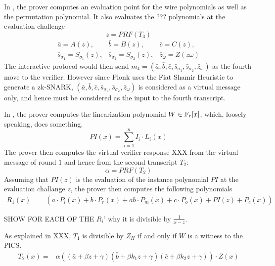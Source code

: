In , the prover computes an evaluation point for the wire polynomials as well as the permutation polynomial. It also evaluates the ??? polynomials at the evaluation challenge  
\begin{equation}
z=PRF(T_3)
\end{equation}
\begin{equation}
\begin{array}{lll}
\bar{a}=A(z), & \bar{b}=B(z), & \bar{c}=C(z), \\ 
\bar{s}_{\sigma_1}=S_{\sigma_1}(z), & \bar{s}_{\sigma_2}=S_{\sigma_2}(z), &\bar{z}_{\omega}=Z(z{\omega})
\end{array}
\end{equation}
The interactive protocol would then send $m_4=(\bar{a}, \bar{b}, \bar{c}, \bar{s}_{\sigma_1},
\bar{s}_{\sigma_2}, \bar{z}_{\omega})$ as the fourth move to the verifier. However since Plonk uses the Fiat Shamir Heuristic to generate a zk-SNARK, $(\bar{a}, \bar{b}, \bar{c}, \bar{s}_{\sigma_1},\bar{s}_{\sigma_2}, \bar{z}_{\omega})$ is considered as a virtual message only, and hence must be considered as the input to the fourth transcript.

In , the prover computes the linearization polynomial  $W\in \mathbb{F}_r[x]$, which, loosely speaking, does something.
\begin{equation}
PI(x) = \textstyle \sum_{i=1}^n I_i\cdot L_i(x)
\end{equation}
The prover then computes the virtual verifier response XXX from the virtual message of round $1$ and hence from the second transcript $T_2$: 
\begin{equation}
\alpha=PRF(T_2)
\end{equation}
Assuming that $PI(z)$ is the evaluation of the instance polynomial $PI$ at the evaluation challange $z$, the prover then computes the following polynomials
\begin{equation}
\begin{array}{rl}
R_1(x) = & \left(\bar{a} \cdot P_l(x) + \bar{b} \cdot P_r(x) + \bar{a}\bar{b} \cdot P_m(x) + \bar{c} \cdot P_o(x) + PI(z) + P_c(x)\right)
\end{array}
\end{equation}

SHOW FOR EACH OF THE $R_i$' why it is divisible by $\frac{1}{x-z}$.

As explained in XXX, $T_1$ is divisible by $Z_H$ if and only if $W$ is a witness to the PlCS. 
\begin{equation}
\begin{array}{rl}
T_2(x) = & \alpha\left((\bar{a} + \beta z + \gamma)(\bar{b} + \beta k_1 z + \gamma)(\bar{c} + \beta k_2 z + \gamma)\right)\cdot Z(x)
\end{array}
\end{equation}

